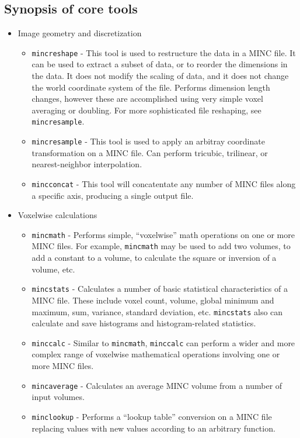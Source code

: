 \documentclass{article}
\begin{document}
\subsection{Synopsis of core tools}
\begin{itemize}
\item Image geometry and discretization
\begin{itemize}
\item {\tt mincreshape} - This tool is used to restructure the data in a MINC
file.  It can be used to extract a subset of data, or to reorder the 
dimensions in the data.  It does not modify the scaling of data, and it
does not change the world coordinate system of the file.  Performs dimension
length changes, however these are accomplished using very simple voxel
averaging or doubling.  For more sophisticated file reshaping, see
{\tt mincresample}.
\item {\tt mincresample} - This tool is used to apply an arbitray coordinate
transformation on a MINC file.  Can perform tricubic, trilinear, or
nearest-neighbor interpolation.
\item {\tt mincconcat} - This tool will concatentate any number of MINC
files along a specific axis, producing a single output file.
\end{itemize}
\item Voxelwise calculations
\begin{itemize}
\item {\tt mincmath} - Performs simple, ``voxelwise'' math operations
on one or more MINC files.  For example, {\tt mincmath} may be used
to add two volumes, to add a constant to a volume, to calculate the
square or inversion of a volume, etc.
\item {\tt mincstats} - Calculates a number of basic statistical
characteristics of a MINC file.  These include voxel count, volume,
global minimum and maximum, sum, variance, standard deviation, etc.
{\tt mincstats} also can calculate and save histograms and
histogram-related statistics.
\item {\tt minccalc} - Similar to {\tt mincmath}, {\tt minccalc} can perform
a wider and more complex range of voxelwise mathematical operations
involving one or more MINC files.
\item {\tt mincaverage} - Calculates an average MINC volume from a number of
input volumes.
\item {\tt minclookup} - Performs a ``lookup table'' conversion on a MINC file
replacing values with new values according to an arbitrary function.

\end{itemize}
\end{itemize}
\end{document}

